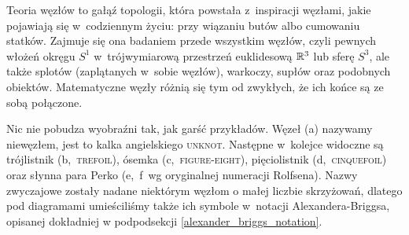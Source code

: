 
Teoria węzłów to gałąź topologii, która powstała z~inspiracji węzłami, jakie pojawiają się w~codziennym życiu: przy wiązaniu butów albo cumowaniu statków.
Zajmuje się ona badaniem przede wszystkim węzłów, czyli pewnych włożeń okręgu $S^1$ w~trójwymiarową przestrzeń euklidesową $\mathbb R^3$ lub sferę $S^3$, ale także splotów (zaplątanych w~sobie węzłów), warkoczy, supłów oraz podobnych obiektów.
Matematyczne węzły różnią się tym od zwykłych, że ich końce są ze sobą połączone.

Nic nie pobudza wyobraźni tak, jak garść przykładów.
Węzeł (a) nazywamy niewęzłem, jest to kalka angielskiego \textsc{unknot}.
Następne w~kolejce widoczne są trójlistnik (b,~\textsc{trefoil}), ósemka (c,~\textsc{figure-eight}), pięciolistnik (d,~\textsc{cinquefoil}) oraz słynna para Perko (e,~f~wg oryginalnej numeracji Rolfsena).
Nazwy zwyczajowe zostały nadane niektórym węzłom o małej liczbie skrzyżowań, dlatego pod diagramami umieściliśmy także ich symbole w~notacji Alexandera-Briggsa, opisanej dokładniej w podpodsekcji \ref{alexander_briggs_notation}.

